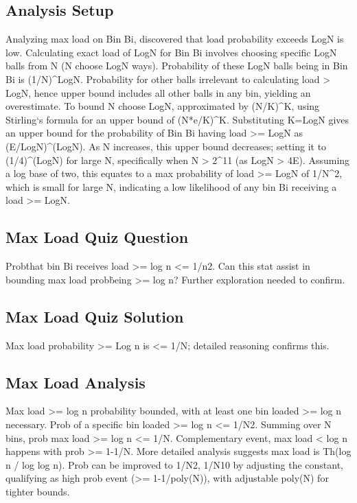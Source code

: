 \subsection*{Analysis Setup}
Analyzing max load on Bin Bi, discovered that load probability exceeds LogN is low.
Calculating exact load of LogN for Bin Bi involves choosing specific LogN balls from N (N choose LogN ways).
Probability of these LogN balls being in Bin Bi is (1/N)\textasciicircum{}LogN\@.
Probability for other balls irrelevant to calculating load \textgreater{} LogN, hence upper bound includes all other balls in any bin, yielding an overestimate.
To bound N choose LogN, approximated by (N/K)\textasciicircum{}K, using Stirling`s formula for an upper bound of (N*e/K)\textasciicircum{}K\@.
Substituting K=LogN gives an upper bound for the probability of Bin Bi having load \textgreater{}= LogN as (E/LogN)\textasciicircum{}(LogN).
As N increases, this upper bound decreases; setting it to (1/4)\textasciicircum{}(LogN) for large N, specifically when N \textgreater{} 2\textasciicircum{}11 (as LogN \textgreater{} 4E).
Assuming a log base of two, this equates to a max probability of load \textgreater{}= LogN of 1/N\textasciicircum{}2, which is small for large N, indicating a low likelihood of any bin Bi receiving a load \textgreater{}= LogN\@.

\subsection*{Max Load Quiz Question}
Prob\. that bin Bi receives load \textgreater{}= log n \textless{}= 1/n2.
Can this stat assist in bounding max load prob\. being \textgreater{}= log n?
Further exploration needed to confirm.

\subsection*{Max Load Quiz Solution}
Max load probability \textgreater{}= Log n is \textless{}= 1/N; detailed reasoning confirms this.

\subsection*{Max Load Analysis}
Max load \textgreater{}= log n probability bounded, with at least one bin loaded \textgreater{}= log n necessary.
Prob of a specific bin loaded \textgreater{}= log n \textless{}= 1/N2.
Summing over N bins, prob max load \textgreater{}= log n \textless{}= 1/N\@.
Complementary event, max load \textless{} log n happens with prob \textgreater{}= 1-1/N\@.
More detailed analysis suggests max load is Th(log n / log log n).
Prob can be improved to 1/N2, 1/N10 by adjusting the constant, qualifying as high prob event (\textgreater{}= 1-1/poly(N)), with adjustable poly(N) for tighter bounds.

